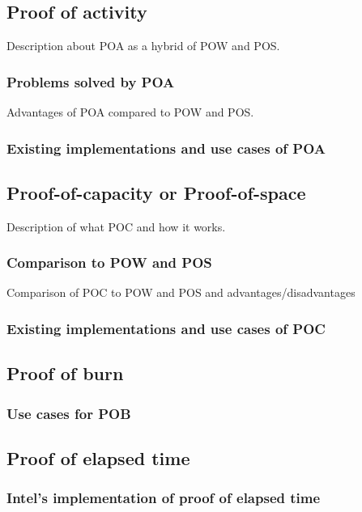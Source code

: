 \documentclass{acm_proc_article-sp}
\begin{document}
\subsection{Proof of activity}

Description about POA as a hybrid of POW and POS.


\subsubsection{Problems solved by POA}

Advantages of POA compared to POW and POS.


\subsubsection{Existing implementations and use cases of POA}


\subsection{Proof-of-capacity or Proof-of-space}

Description of what POC and how it works.


\subsubsection{Comparison to POW and POS}

Comparison of POC to POW and POS and advantages/disadvantages


\subsubsection{Existing implementations and use cases of POC}


\subsection{Proof of burn}


\subsubsection{Use cases for POB}


\subsection{Proof of elapsed time}


\subsubsection{Intel's implementation of proof of elapsed time}
\end{document}
